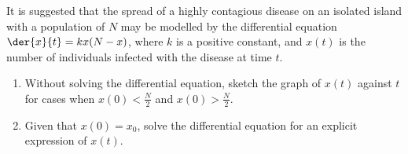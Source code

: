 \begin{problem}
    It is suggested that the spread of a highly contagious disease on an isolated island with a population of $N$ may be modelled by the differential equation $\der{x}{t} = kx(N-x)$, where $k$ is a positive constant, and $x(t)$ is the number of individuals infected with the disease at time $t$.
    \begin{enumerate}
        \item Without solving the differential equation, sketch the graph of $x(t)$ against $t$ for cases when $x(0) < \frac{N}2$ and $x(0) > \frac{N}{2}$.
        \item Given that $x(0) = x_0$, solve the differential equation for an explicit expression of $x(t)$.
    \end{enumerate}
\end{problem}
